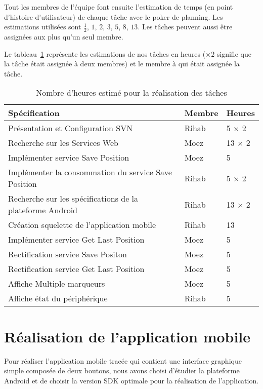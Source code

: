 Tout les membres de l'équipe font ensuite l'estimation de temps (en point
d'histoire d'utilisateur) de chaque tâche avec le poker de planning. Les
estimations utilisées sont $\frac{1}{2}$, $1$, $2$, $3$, $5$, $8$, $13$. Les
tâches peuvent aussi être assignées aux plus qu'un seul membre.

Le tableau~\ref{tab:sprint1-estimation} représente les estimations de nos
tâches en heures ($\times2$ signifie que la tâche était assignée à deux
membres) et le membre à qui était assignée la tâche.

\begin{table}[H]
    \begin{tabular}{| l | l | l |}
        \hline
        \textbf{Spécification} & \textbf{Membre} & \textbf{Heures} \\ \hline
        \hline
Présentation et Configuration SVN & Rihab & 5 $\times$ 2 \\ \hline
Recherche sur les Services Web & Moez & 13 $\times$ 2 \\ \hline
Implémenter service Save Position & Moez & 5 \\ \hline
Implémenter la consommation du service Save Position & Rihab & 5 $\times$ 2 \\ \hline
Recherche sur les spécifications de la plateforme Android & Rihab & 13 $\times$ 2 \\ \hline
Création squelette de l'application mobile & Rihab & 13 \\ \hline
Implémenter service Get Last Position & Moez & 5 \\ \hline
Rectification service Save Positon & Moez & 5 \\ \hline
Rectification service Get Last Position & Moez & 5 \\ \hline
Affiche Multiple marqueurs & Moez & 5 \\ \hline
Affiche état du périphérique & Rihab & 5 \\ \hline
    \end{tabular}
        \caption{Nombre d'heures estimé pour la réalisation des tâches}
\label{tab:sprint1-estimation}
\end{table}

\section{Réalisation de l'application mobile}

Pour réaliser l'application mobile tracée qui contient une interface graphique
simple composée de deux boutons, nous avons choisi d'étudier la plateforme
Android et de choisir la version SDK optimale pour la réalisation de
l'application.

